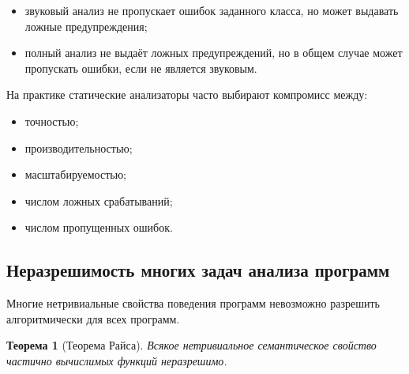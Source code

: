 \documentclass[12pt,a4paper]{article}
\newtheorem{theorem}{Теорема}
\begin{document}
\begin{itemize}
  \item звуковый анализ не пропускает ошибок заданного класса, но может выдавать ложные предупреждения;
  \item полный анализ не выдаёт ложных предупреждений, но в общем случае может пропускать ошибки, если не является звуковым.
\end{itemize}

На практике статические анализаторы часто выбирают компромисс между:

\begin{itemize}
  \item точностью;
  \item производительностью;
  \item масштабируемостью;
  \item числом ложных срабатываний;
  \item числом пропущенных ошибок.
\end{itemize}

\subsection{Неразрешимость многих задач анализа программ}

Многие нетривиальные свойства поведения программ невозможно разрешить алгоритмически для всех программ.

\begin{theorem}[Теорема Райса]
Всякое нетривиальное семантическое свойство частично вычислимых функций неразрешимо.
\end{theorem}
\end{document}

